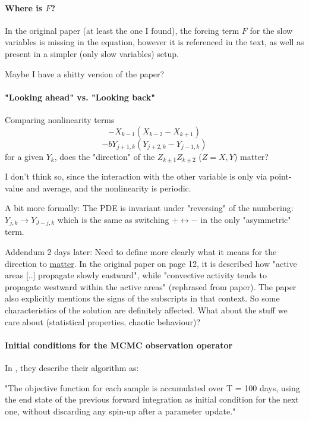 \documentclass[11pt]{article}
\begin{document}
\paragraph{Where is \(F\)?}
\label{sec:org54e57f5}
In the original paper (at least the one I found), the forcing term \(F\) for the
slow variables is missing in the equation, however it is referenced in the text,
as well as present in a simpler (only slow variables) setup.

Maybe I have a shitty version of the paper?

\paragraph{"Looking ahead" vs. "Looking back"}
\label{sec:org83c0325}
Comparing nonlinearity terms
$$-X_{k-1}(X_{k-2} - X_{k+1})$$
$$-bY_{j+1,k}(Y_{j+2,k} - Y_{j-1, k})$$
for a given \(Y_{k}\), does the "direction" of the \(Z_{k\pm 1}Z_{k\pm 2}\) (\(Z=X,Y\)) matter?

I don't think so, since the interaction with the other variable is only via point-value
and average, and the nonlinearity is periodic.

A bit more formally:
The PDE is invariant under "reversing" of the numbering:
\(Y_{j,k} \rightarrow Y_{J-j,k}\) which is the same as switching \(+ \leftrightarrow -\) in
the only "asymmetric" term.

Addendum 2 days later: Need to define more clearly what it means for the direction to
\uline{matter}. In the original paper on page 12, it is described how "active areas [..] propagate
slowly eastward", while "convective activity tends to propagate westward within the active
areas" (rephrased from paper). The paper also explicitly mentions the signs of the subscripts
in that context. So some characteristics of the solution are definitely affected.
What about the stuff we care about (statistical properties, chaotic behaviour)?

\paragraph{Initial conditions for the MCMC observation operator}
\label{sec:orgeecad4c}
In \cite{schneider_earth_2017}, they describe their algorithm as:

"The objective function for each sample is accumulated over T = 100 days, using the end state
of the previous forward integration as initial condition for the next one, without discarding
any spin-up after a parameter update."
\end{document}
